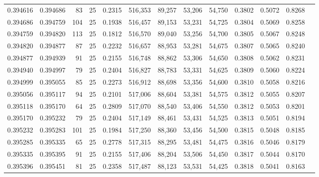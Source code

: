 \begin{tabular}{rrrrrrrrrrrrr}
0.394616 & 0.394686 &    83 &  25 &                                     0.2315 & 516,353 &  89,257 &  53,206 &  54,750 & 0.3802 & 0.5072 & 0.8268 \\
0.394686 & 0.394759 &   104 &  25 &                                     0.1938 & 516,457 &  89,153 &  53,231 &  54,725 & 0.3804 & 0.5069 & 0.8258 \\
0.394759 & 0.394820 &   113 &  25 &                                     0.1812 & 516,570 &  89,040 &  53,256 &  54,700 & 0.3805 & 0.5067 & 0.8248 \\
0.394820 & 0.394877 &    87 &  25 &                                     0.2232 & 516,657 &  88,953 &  53,281 &  54,675 & 0.3807 & 0.5065 & 0.8240 \\
0.394877 & 0.394939 &    91 &  25 &                                     0.2155 & 516,748 &  88,862 &  53,306 &  54,650 & 0.3808 & 0.5062 & 0.8231 \\
0.394940 & 0.394997 &    79 &  25 &                                     0.2404 & 516,827 &  88,783 &  53,331 &  54,625 & 0.3809 & 0.5060 & 0.8224 \\
0.394999 & 0.395055 &    85 &  25 &                                     0.2273 & 516,912 &  88,698 &  53,356 &  54,600 & 0.3810 & 0.5058 & 0.8216 \\
0.395056 & 0.395117 &    94 &  25 &                                     0.2101 & 517,006 &  88,604 &  53,381 &  54,575 & 0.3812 & 0.5055 & 0.8207 \\
0.395118 & 0.395170 &    64 &  25 &                                     0.2809 & 517,070 &  88,540 &  53,406 &  54,550 & 0.3812 & 0.5053 & 0.8201 \\
0.395170 & 0.395232 &    79 &  25 &                                     0.2404 & 517,149 &  88,461 &  53,431 &  54,525 & 0.3813 & 0.5051 & 0.8194 \\
0.395232 & 0.395283 &   101 &  25 &                                     0.1984 & 517,250 &  88,360 &  53,456 &  54,500 & 0.3815 & 0.5048 & 0.8185 \\
0.395285 & 0.395335 &    65 &  25 &                                     0.2778 & 517,315 &  88,295 &  53,481 &  54,475 & 0.3816 & 0.5046 & 0.8179 \\
0.395335 & 0.395395 &    91 &  25 &                                     0.2155 & 517,406 &  88,204 &  53,506 &  54,450 & 0.3817 & 0.5044 & 0.8170 \\
0.395396 & 0.395451 &    81 &  25 &                                     0.2358 & 517,487 &  88,123 &  53,531 &  54,425 & 0.3818 & 0.5041 & 0.8163 \\

\end{tabular}
